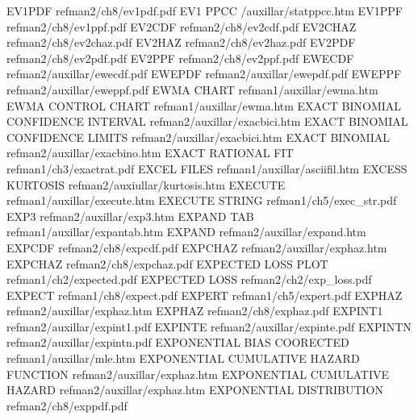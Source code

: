 EV1PDF                                  refman2/ch8/ev1pdf.pdf
EV1 PPCC                                /auxillar/statppcc.htm
EV1PPF                                  refman2/ch8/ev1ppf.pdf
EV2CDF                                  refman2/ch8/ev2cdf.pdf
EV2CHAZ                                 refman2/ch8/ev2chaz.pdf
EV2HAZ                                  refman2/ch8/ev2haz.pdf
EV2PDF                                  refman2/ch8/ev2pdf.pdf
EV2PPF                                  refman2/ch8/ev2ppf.pdf
EWECDF                                  refman2/auxillar/ewecdf.pdf
EWEPDF                                  refman2/auxillar/ewepdf.pdf
EWEPPF                                  refman2/auxillar/eweppf.pdf
EWMA CHART                              refman1/auxillar/ewma.htm
EWMA CONTROL CHART                      refman1/auxillar/ewma.htm
EXACT BINOMIAL CONFIDENCE INTERVAL      refman2/auxillar/exacbici.htm
EXACT BINOMIAL CONFIDENCE LIMITS        refman2/auxillar/exacbici.htm
EXACT BINOMIAL                          refman2/auxillar/exacbino.htm
EXACT RATIONAL FIT                      refman1/ch3/exactrat.pdf
EXCEL FILES                             refman1/auxillar/asciifil.htm
EXCESS KURTOSIS                         refman2/auxiullar/kurtosis.htm
EXECUTE                                 refman1/auxillar/execute.htm
EXECUTE STRING                          refman1/ch5/exec_str.pdf
EXP3                                    refman2/auxillar/exp3.htm
EXPAND TAB                              refman1/auxillar/expantab.htm
EXPAND                                  refman2/auxillar/expand.htm
EXPCDF                                  refman2/ch8/expcdf.pdf
EXPCHAZ                                 refman2/auxillar/exphaz.htm
EXPCHAZ                                 refman2/ch8/expchaz.pdf
EXPECTED LOSS PLOT                      refman1/ch2/expected.pdf
EXPECTED LOSS                           refman2/ch2/exp_loss.pdf
EXPECT                                  refman1/ch8/expect.pdf
EXPERT                                  refman1/ch5/expert.pdf
EXPHAZ                                  refman2/auxillar/exphaz.htm
EXPHAZ                                  refman2/ch8/exphaz.pdf
EXPINT1                                 refman2/auxillar/expint1.pdf
EXPINTE                                 refman2/auxillar/expinte.pdf
EXPINTN                                 refman2/auxillar/expintn.pdf
EXPONENTIAL BIAS COORECTED              refman1/auxillar/mle.htm
EXPONENTIAL CUMULATIVE HAZARD FUNCTION  refman2/auxillar/exphaz.htm
EXPONENTIAL CUMULATIVE HAZARD           refman2/auxillar/exphaz.htm
EXPONENTIAL DISTRIBUTION                refman2/ch8/exppdf.pdf
